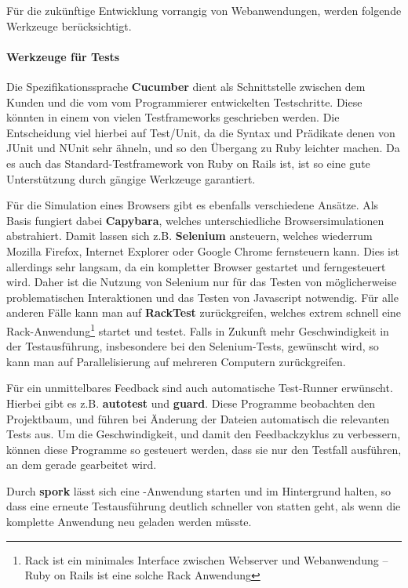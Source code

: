 Für die zukünftige Entwicklung vorrangig von Webanwendungen, werden folgende Werkzeuge berücksichtigt.

\paragraph{Werkzeuge für Tests} Die Spezifikationssprache \textbf{Cucumber} dient als Schnittstelle zwischen dem Kunden und die vom vom Programmierer entwickelten Testschritte. Diese könnten in einem von vielen Testframeworks geschrieben werden. Die Entscheidung viel hierbei auf Test/Unit, da die Syntax und Prädikate denen von JUnit und NUnit sehr ähneln, und so den Übergang zu Ruby leichter machen. Da es auch das Standard-Testframework von Ruby on Rails ist, ist so eine gute Unterstützung durch gängige Werkzeuge garantiert.

Für die Simulation eines Browsers gibt es ebenfalls verschiedene Ansätze. Als Basis fungiert dabei \textbf{Capybara}, welches unterschiedliche Browsersimulationen abstrahiert. Damit lassen sich z.B. \textbf{Selenium} ansteuern, welches wiederrum Mozilla Firefox, Internet Explorer oder Google Chrome fernsteuern kann. Dies ist allerdings sehr langsam, da ein kompletter Browser gestartet und ferngesteuert wird. Daher ist die Nutzung von Selenium nur für das Testen von möglicherweise problematischen Interaktionen und das Testen von Javascript notwendig. Für alle anderen Fälle kann man auf \textbf{RackTest} zurückgreifen, welches extrem schnell eine Rack-Anwendung\footnote{Rack ist ein minimales Interface zwischen Webserver und Webanwendung -- Ruby on Rails ist eine solche Rack Anwendung} startet und testet.
Falls in Zukunft mehr Geschwindigkeit in der Testausführung, insbesondere bei den Selenium-Tests, gewünscht wird, so kann man auf Parallelisierung auf mehreren Computern zurückgreifen.

Für ein unmittelbares Feedback sind auch automatische Test-Runner erwünscht. Hierbei gibt es z.B. \textbf{autotest} und \textbf{guard}. Diese Programme beobachten den Projektbaum, und führen bei Änderung der Dateien automatisch die relevanten Tests aus. Um die Geschwindigkeit, und damit den Feedbackzyklus zu verbessern, können diese Programme so gesteuert werden, dass sie nur den Testfall ausführen, an dem gerade gearbeitet wird.

Durch \textbf{spork} lässt sich eine -Anwendung starten und im Hintergrund halten, so dass eine erneute Testausführung deutlich schneller von statten geht, als wenn die komplette Anwendung neu geladen werden müsste.


